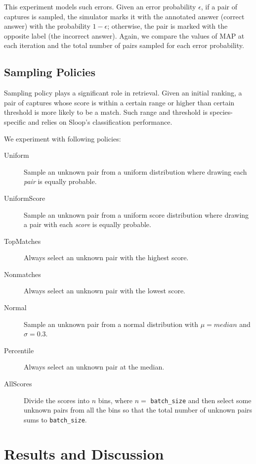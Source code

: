 This experiment models such errors. Given an error probability $\epsilon$, if
a pair of captures is sampled, the simulator marks it with the annotated answer
(correct answer) with the probability $1-\epsilon$; otherwise, the pair is
marked with the opposite label (the incorrect answer). Again, we compare the
values of MAP at each iteration and the total number of pairs sampled for each
error probability.

\subsection{Sampling Policies} %
\label{sub:sampling_policies}

Sampling policy plays a significant role in retrieval. Given an initial
ranking, a pair of captures whose score is within a certain range or higher
than certain threshold is more likely to be a match. Such range and threshold
is species-specific and relies on Sloop's classification performance.

We experiment with following policies:
\begin{description}
  \item [Uniform]
  Sample an unknown pair from a uniform distribution where drawing each
    \emph{pair} is equally probable.
  \item [UniformScore]
  Sample an unknown pair from a uniform score distribution where drawing a pair
    with each \emph{score} is equally probable.
  \item [TopMatches]
  Always select an unknown pair with the highest score.
  \item [Nonmatches]
  Always select an unknown pair with the lowest score.
  \item [Normal]
  Sample an unknown pair from a normal distribution with $\mu=median$ and
    $\sigma=0.3$.
  \item [Percentile]
  Always select an unknown pair at the median.
  \item [AllScores]
  Divide the scores into $n$ bins, where $n=$ \texttt{batch\_size} and then
  select some unknown pairs from all the bins so that the total number of
  unknown pairs sums to \texttt{batch\_size}.
\end{description}



\section{Results and Discussion} %
\label{sec:results}

